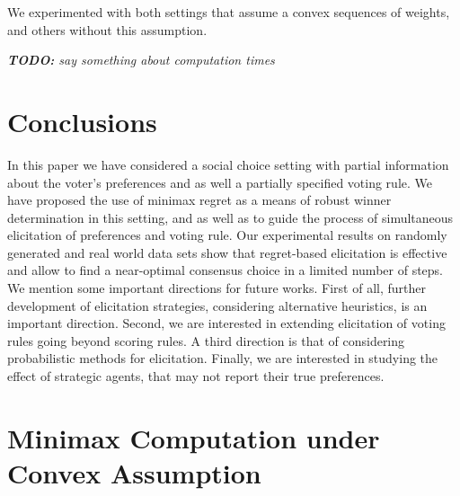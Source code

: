 \documentclass[12pt]{article}
\begin{document}
We experimented with both settings that assume a convex sequences of weights, and others without this assumption.

{\em {\bf TODO:} say something about computation times}


\section{Conclusions}  \label{sec:conclusions}

In this paper we have considered a  social choice setting with partial  information about the voter's  
preferences and as well a partially specified voting rule.
We have proposed the use of minimax regret as a means of robust winner determination in this setting, and as well as to guide the process of simultaneous elicitation of preferences and voting rule.
Our experimental results on randomly generated and real world data sets show that regret-based elicitation is effective and allow to find a near-optimal consensus choice in a limited number of steps.
We mention some  important directions for future works.
First of all, further development of elicitation strategies, considering alternative heuristics, is an important direction. 
Second, we are interested in extending elicitation of voting rules going beyond scoring rules.
A third direction is that of considering probabilistic methods for elicitation.
Finally, we are interested in studying the effect of strategic agents, that may not report their true preferences.



% 

\pagebreak
\ifappendix
\appendix
\section{Minimax Computation under Convex Assumption} 
\end{document}
